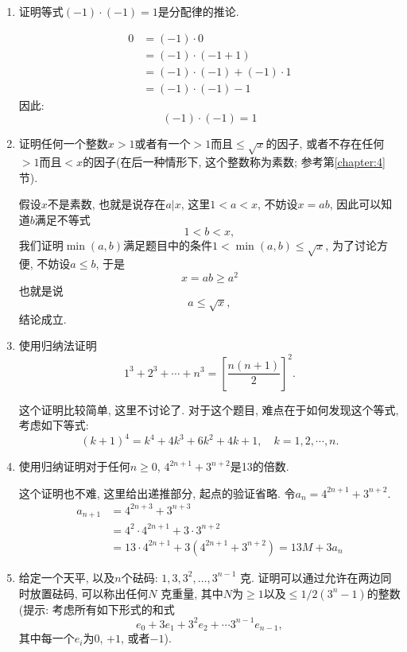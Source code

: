 \documentclass[12pt,a4paper]{book} %
\theoremstyle{remark}
\theoremstyle{example}
\theoremstyle{lemma}
\theoremstyle{corollary}
\numberwithin{theorem}{chapter}
\begin{document}
\begin{enumerate}
\item 证明等式$(-1) \cdot (-1) = 1$是分配律的推论.

\begin{proofname}
\[
\begin{aligned}
0 &= (-1) \cdot 0 \\
&= (-1)\cdot(-1 + 1) \\
&= (-1)\cdot(-1) + (-1) \cdot 1 \\
&= (-1)\cdot(-1) - 1
\end{aligned}
\]
因此:
\[
(-1) \cdot(-1) = 1
\]
\end{proofname}

\item 证明任何一个整数$x > 1$或者有一个$> 1$而且$\le \sqrt{x}$的因子, 或者不存在任何$> 1$而且$< x$的因子(在后一种情形下, 这个整数称为素数; 参考第\ref{chapter:4}节).

\begin{proofname}

假设$x$不是素数, 也就是说存在$a | x$, 这里$1 < a < x$, 不妨设$x = ab$, 因此可以知道$b$满足不等式
\[
1 < b < x,
\]
我们证明$\min(a, b)$满足题目中的条件$1 < \min(a, b) \le \sqrt{x}$, 为了讨论方便, 不妨设$a \le b$, 于是
\[
x = ab \ge a^2
\]
也就是说
\[
a \le \sqrt{x},
\]
结论成立.
\end{proofname}

\item 使用归纳法证明
\[
1^3 + 2^3 + \cdots + n^3 = [\frac{n(n + 1)}{2}]^2.
\]

这个证明比较简单, 这里不讨论了. 对于这个题目, 难点在于如何发现这个等式, 考虑如下等式:
\[
(k + 1)^4 = k^4 + 4k^3 + 6k^2 + 4k + 1, \quad k=1,2, \cdots, n.
\]

\item 使用归纳证明对于任何$n \ge 0$, $4^{2n+1} + 3^{n+2}$是13的倍数.

这个证明也不难, 这里给出递推部分, 起点的验证省略. 令$a_n = 4^{2n+1} + 3^{n+2}$.
\[
\begin{aligned}
a_{n+1} &= 4^{2n+3} + 3^{n+3} \\
&= 4^2 \cdot 4^{2n+1} + 3 \cdot 3^{n+2} \\
&= 13 \cdot 4^{2n+1} + 3(4^{2n+1} + 3^{n+2}) = 13M + 3a_n
\end{aligned}
\]


\item 给定一个天平, 以及$n$个砝码: $1, 3, 3^2, \ldots, 3^{n-1}$ 克. 证明可以通过允许在两边同时放置砝码, 可以称出任何$N$ 克重量, 其中$N$为$\ge 1$以及$\le 1/2(3^n - 1)$的整数 (提示: 考虑所有如下形式的和式
\[
e_0 + 3e_1 + 3^2e_2 + \cdots 3^{n-1}e_{n-1},
\]
其中每一个$e_i$为$0$, $+1$, 或者$-1$).


\end{enumerate}
\end{document}
